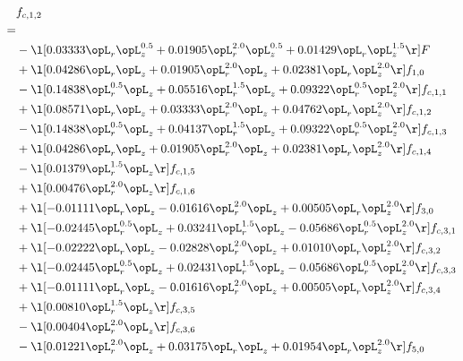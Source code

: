 \begin{alignat}{2} 
\label{eq:f_12_1} 
& f_{c,1,2} \nonumber \\ 
 = \\ 
& - \l[  0.03333 \opL_r \opL_z^{0.5} +  0.01905 \opL_r^{2.0} \opL_z^{0.5} +  0.01429 \opL_r \opL_z^{1.5}  \r] F \nonumber \\ 
& + \l[  0.04286 \opL_r \opL_z +  0.01905 \opL_r^{2.0} \opL_z +  0.02381 \opL_r \opL_z^{2.0}  \r] f_{1,0} \nonumber \\ 
& - \l[  0.14838 \opL_r^{0.5} \opL_z +  0.05516 \opL_r^{1.5} \opL_z +  0.09322 \opL_r^{0.5} \opL_z^{2.0}  \r] f_{c,1,1} \nonumber \\ 
& + \l[  0.08571 \opL_r \opL_z +  0.03333 \opL_r^{2.0} \opL_z +  0.04762 \opL_r \opL_z^{2.0}  \r] f_{c,1,2} \nonumber \\ 
& - \l[  0.14838 \opL_r^{0.5} \opL_z +  0.04137 \opL_r^{1.5} \opL_z +  0.09322 \opL_r^{0.5} \opL_z^{2.0}  \r] f_{c,1,3} \nonumber \\ 
& + \l[  0.04286 \opL_r \opL_z +  0.01905 \opL_r^{2.0} \opL_z +  0.02381 \opL_r \opL_z^{2.0}  \r] f_{c,1,4} \nonumber \\ 
& - \l[  0.01379 \opL_r^{1.5} \opL_z  \r] f_{c,1,5} \nonumber \\ 
& + \l[  0.00476 \opL_r^{2.0} \opL_z  \r] f_{c,1,6} \nonumber \\ 
& + \l[  -0.01111 \opL_r \opL_z   -0.01616 \opL_r^{2.0} \opL_z +  0.00505 \opL_r \opL_z^{2.0}  \r] f_{3,0} \nonumber \\ 
& + \l[  -0.02445 \opL_r^{0.5} \opL_z +  0.03241 \opL_r^{1.5} \opL_z   -0.05686 \opL_r^{0.5} \opL_z^{2.0}  \r] f_{c,3,1} \nonumber \\ 
& + \l[  -0.02222 \opL_r \opL_z   -0.02828 \opL_r^{2.0} \opL_z +  0.01010 \opL_r \opL_z^{2.0}  \r] f_{c,3,2} \nonumber \\ 
& + \l[  -0.02445 \opL_r^{0.5} \opL_z +  0.02431 \opL_r^{1.5} \opL_z   -0.05686 \opL_r^{0.5} \opL_z^{2.0}  \r] f_{c,3,3} \nonumber \\ 
& + \l[  -0.01111 \opL_r \opL_z   -0.01616 \opL_r^{2.0} \opL_z +  0.00505 \opL_r \opL_z^{2.0}  \r] f_{c,3,4} \nonumber \\ 
& + \l[  0.00810 \opL_r^{1.5} \opL_z  \r] f_{c,3,5} \nonumber \\ 
& - \l[  0.00404 \opL_r^{2.0} \opL_z  \r] f_{c,3,6} \nonumber \\ 
& - \l[  0.01221 \opL_r^{2.0} \opL_z +  0.03175 \opL_r \opL_z +  0.01954 \opL_r \opL_z^{2.0}  \r] f_{5,0} \nonumber \\ 

\end{alignat}
